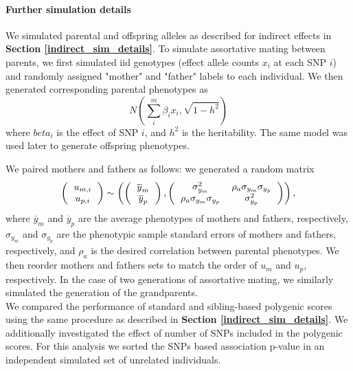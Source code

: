 \documentclass[hidelinks, 12pt]{article}
\begin{document}
\paragraph{Further simulation details}
\label{assortative_sim_details} 
We simulated parental and offspring alleles as described for indirect effects in {\bf Section \ref{indirect_sim_details}}. To simulate assortative mating between parents, we first simulated iid genotypes (effect allele counts $x_i$ at each SNP $i$) and randomly assigned "mother" and "father" labels to each individual. We then generated corresponding parental phenotypes as
$$N(\sum_i^m\beta_ix_i,\sqrt{1-h^2})$$ where  $beta_i$ is the effect of SNP $i$, and $h^2$ is the heritability.  The same model was used later to generate offspring phenotypes.

We paired mothers and fathers as follows: we generated a random matrix  
\[ 
\left (
  \begin{tabular}{c}
  $u_{m,i}$ \\
  $u_{p,i}$
  \end{tabular}
\right ) \sim
\left ( \left (
  \begin{tabular}{c}
  $\overline{y}_m$ \\
  $\overline{y}_p$
  \end{tabular}
\right ),
\left (
  \begin{tabular}{cc}
  $\sigma_{y_m}^2$ & $\rho_a \sigma_{y_m} \sigma_{y_p}$  \\
  $\rho_a \sigma_{y_m} \sigma_{y_p}$ & $\sigma_{y_p}^2$ 
  \end{tabular}
\right )\right ), 
\] where $\overline{y}_m$ and $\overline{y}_p$ are the average phenotypes of mothers and fathers, respectively, $\sigma_{y_m}$ and $\sigma_{y_p}$ are the phenotypic sample standard errors of mothers and fathers, respectively, and $\rho_a$ is the desired correlation between parental phenotypes.  We then reorder mothers and fathers sets to match the order of $u_m$ and $u_p$, respectively. In the case of two generations of assortative mating, we similarly simulated the generation of the grandparents.\\

We compared the performance of standard and sibling-based polygenic scores using the same procedure as described in {\bf Section \ref{indirect_sim_details}}. We additionally investigated the effect of number of SNPs included in the polygenic scores. For this analysis we sorted the SNPs based association p-value in an independent simulated set of unrelated individuals.\\ 
\end{document}
